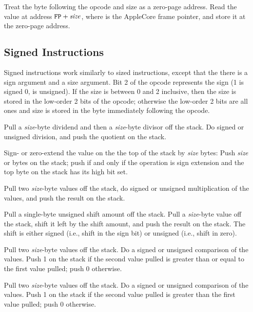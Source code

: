 \documentclass[10pt]{article}
\begin{document}
Treat the byte following the opcode and size as a zero-page
address.  Read the value at address $\texttt{FP}+\mbox{\textit{size}}$, 
where  is the AppleCore frame pointer, and store
it at the zero-page address.

\subsection{Signed Instructions}

Signed instructions work similarly to sized instructions, except that
the there is a sign argument and a size argument.  Bit 2 of the opcode
represents the sign (1 is signed 0, is unsigned).  If the size is
between 0 and 2 inclusive, then the size is stored in the low-order 2
bits of the opcode; otherwise the low-order 2 bits are all ones and
size is stored in the byte immediately following the opcode.

 Pull a \emph{size}-byte
dividend and then a \emph{size}-byte divisor off the stack.  Do signed
or unsigned division, and push the quotient on the stack.

 Sign- or zero-extend the
value on the the top of the stack by \emph{size} bytes: Push
\emph{size}  or  bytes on the stack; push
 if and only if the operation is sign extension and the top
byte on the stack has its high bit set.

 Pull two \emph{size}-byte
values off the stack, do signed or unsigned multiplication of the
values, and push the result on the stack.

 Pull a single-byte
unsigned shift amount off the stack.  Pull a \emph{size}-byte value
off the stack, shift it left by the shift amount, and push the result
on the stack.  The shift is either signed (i.e., shift in the sign
bit) or unsigned (i.e., shift in zero).

 Pull two
\emph{size}-byte values off the stack. Do a signed or unsigned
comparison of the values.  Push 1 on the stack if the second value
pulled is greater than or equal to the first value pulled; push 0
otherwise.

 Pull two
\emph{size}-byte values off the stack. Do a signed or unsigned
comparison of the values.  Push 1 on the stack if the second value
pulled is greater than the first value pulled; push 0 otherwise.
\end{document}
